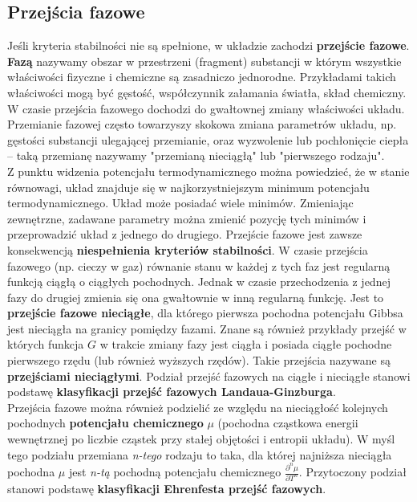 \documentclass[12pt,a4paper,openright]{report} %
\begin{document}
\subsection{Przejścia fazowe} 
Jeśli kryteria stabilności nie są spełnione, w układzie zachodzi \textbf{przejście fazowe}. \\
\textbf{Fazą} nazywamy obszar w przestrzeni (fragment) substancji w którym wszystkie właściwości fizyczne i chemiczne są zasadniczo jednorodne. Przykładami takich właściwości mogą być gęstość, współczynnik załamania światła, skład chemiczny.\\
W czasie przejścia fazowego dochodzi do gwałtownej zmiany właściwości układu.
Przemianie fazowej często towarzyszy skokowa zmiana parametrów układu, np. gęstości substancji ulegającej przemianie, oraz wyzwolenie lub pochłonięcie ciepła – taką przemianę nazywamy "przemianą nieciągłą" lub "pierwszego rodzaju".\\
Z punktu widzenia potencjału termodynamicznego można powiedzieć, że w stanie równowagi, układ znajduje się w najkorzystniejszym minimum potencjału termodynamicznego. Układ może posiadać wiele minimów. Zmieniając zewnętrzne, zadawane parametry można zmienić pozycję tych minimów i przeprowadzić układ z jednego do drugiego. 
Przejście fazowe jest zawsze konsekwencją \textbf{niespełnienia kryteriów stabilności}. 
W czasie przejścia fazowego (np. cieczy w gaz) równanie stanu w każdej z tych faz jest regularną funkcją ciągłą o ciągłych pochodnych. Jednak w czasie przechodzenia z jednej fazy do drugiej zmienia się ona gwałtownie w inną regularną funkcję. Jest to \textbf{przejście fazowe nieciągłe}, dla którego pierwsza pochodna potencjału Gibbsa jest nieciągła na granicy pomiędzy fazami. Znane są również przykłady przejść w których funkcja $G$ w trakcie zmiany fazy jest ciągła i posiada ciągłe pochodne pierwszego rzędu (lub również wyższych rzędów). Takie przejścia nazywane są \textbf{przejściami nieciągłymi}. Podział przejść fazowych na ciągłe i nieciągłe stanowi podstawę \textbf{klasyfikacji przejść fazowych Landaua-Ginzburga}. 
\\
Przejścia fazowe można również podzielić ze względu na nieciągłość kolejnych pochodnych \textbf{potencjału chemicznego} $\mu$ (pochodna cząstkowa energii wewnętrznej po liczbie cząstek przy stałej objętości i entropii układu). W myśl tego podziału przemiana \textit{n-tego} rodzaju to taka, dla której najniższa nieciągła pochodna $\mu$ jest \textit{n-tą} pochodną potencjału chemicznego $\frac{\partial^n \mu}{\partial T^n}$. Przytoczony podział stanowi podstawę \textbf{klasyfikacji Ehrenfesta przejść fazowych}. 
\end{document}

